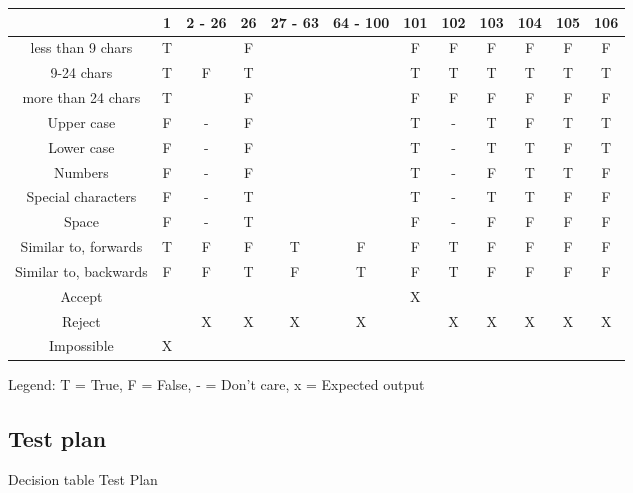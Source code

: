 \documentclass[12pt,letterpaper]{article}
\begin{document}
\begin{center}

    
  \begin{tabular}{c|c|c|c|c|c|c|c|c|c|c|c|}
  & 1 & 2 - 26 & 26 & 27 - 63 & 64 - 100 & 101 & 102 & 103 & 104 & 105 & 106 \\
  \hline
  less than 9 chars & T &  & F &  &  & F & F & F & F & F & F \\
  \hline
  9-24 chars & T & F & T &  &  & T & T & T & T & T & T \\
  \hline
  more than 24 chars & T &  & F & & & F & F & F & F & F & F \\
  \hline
  Upper case & F & - & F &  &  & T & - & T & F & T & T \\
  \hline
  Lower case & F & - & F &  &  & T & - & T & T & F & T \\
  \hline
  Numbers & F & - & F &  &  & T & - & F & T & T & F \\
  \hline
  Special characters & F & - & T &  &  & T & - & T & T & F & F \\
  \hline
  Space & F & - & T &  &  & F & - & F & F & F & F \\
  \hline 
  Similar to, forwards & T & F & F & T & F & F & T & F & F & F & F \\
  \hline
  Similar to, backwards & F & F & T & F & T & F & T & F & F & F & F \\
  \midrule
  Accept & & & & & & X & & & & & \\
  \hline
  Reject & & X & X & X & X & & X & X & X & X & X \\
  \hline
  Impossible & X & & & & & & & & & & \\
  \end{tabular}
    
  Legend: T = True, F = False, - = Don't care, x = Expected output
\end{center}


\subsection{Test plan}

\centering Decision table Test Plan
\end{document}
